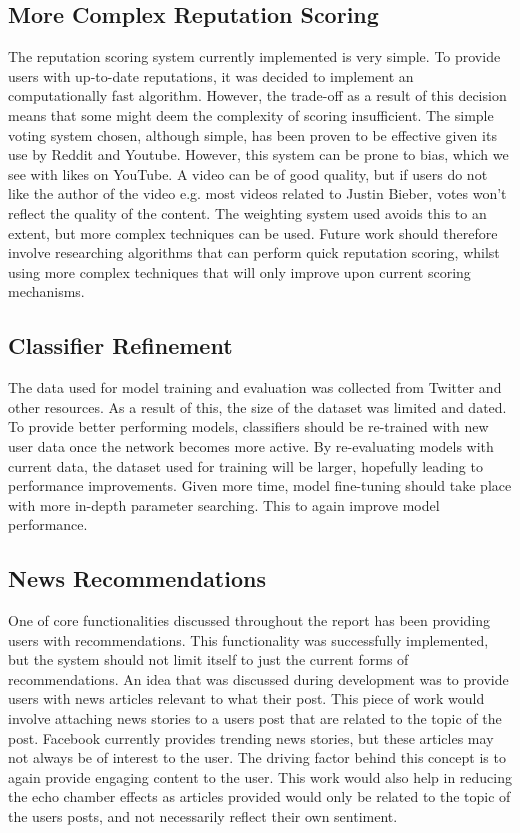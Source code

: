 \subsection{More Complex Reputation Scoring}
The reputation scoring system currently implemented is very simple. To provide users with up-to-date reputations, it was decided to implement an computationally fast algorithm. However, the trade-off as a result of this decision means that some might deem the complexity of scoring insufficient. The simple voting system chosen, although simple, has been proven to be effective given its use by Reddit and Youtube. However, this system can be prone to bias, which we see with likes on YouTube. A video can be of good quality, but if users do not like the author of the video e.g. most videos related to Justin Bieber, votes won't reflect the quality of the content. The weighting system used avoids this to an extent, but more complex techniques can be used. Future work should therefore involve researching algorithms that can perform quick reputation scoring, whilst using more complex techniques that will only improve upon current scoring mechanisms.

\subsection{Classifier Refinement}
The data used for model training and evaluation was collected from Twitter and other resources. As a result of this, the size of the dataset was limited and dated. To provide better performing models, classifiers should be re-trained with new user data once the network becomes more active. By re-evaluating models with current data, the dataset used for training will be larger, hopefully leading to performance improvements. Given more time, model fine-tuning should take place with more in-depth parameter searching. This to again improve model performance.

\subsection{News Recommendations}
One of core functionalities discussed throughout the report has been providing users with recommendations. This functionality was successfully implemented, but the system should not limit itself to just the current forms of recommendations. An idea that was discussed during development was to provide users with news articles relevant to what their post.
This piece of work would involve attaching news stories to a users post that are related to the topic of the post. Facebook currently provides trending news stories, but these articles may not always be of interest to the user. The driving factor behind this concept is to again provide engaging content to the user. This work would also help in reducing the echo chamber effects as articles provided would only be related to the topic of the users posts, and not necessarily reflect their own sentiment.

